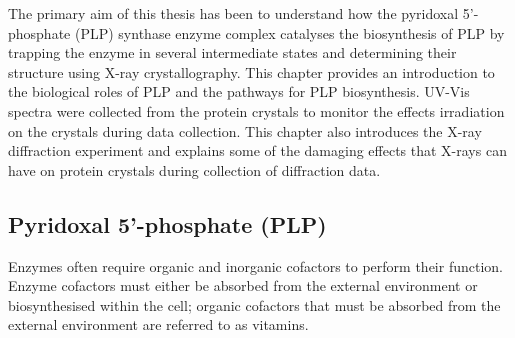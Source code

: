 The primary aim of this thesis has been to understand how the pyridoxal 5'-phosphate (PLP) synthase enzyme complex catalyses the biosynthesis of PLP by trapping the enzyme in several intermediate states and determining their structure using X-ray crystallography. This chapter provides an introduction to the biological roles of PLP and the pathways for PLP biosynthesis. UV-Vis spectra were collected from the protein crystals to monitor the effects irradiation on the crystals during data collection. This chapter also introduces the X-ray diffraction experiment and explains some of the damaging effects that X-rays can have on protein crystals during collection of diffraction data.      
\newpage
\subsection{Pyridoxal 5'-phosphate (PLP)}
Enzymes often require organic and inorganic cofactors to perform their function. Enzyme cofactors must either be absorbed from the external environment or biosynthesised within the cell; organic cofactors that must be absorbed from the external environment are referred to as vitamins.   

